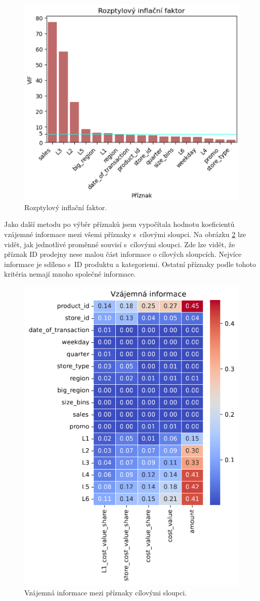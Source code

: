 \begin{figure}[h!]
      \centering
      \includegraphics[width=.6\textwidth]{obrazky/zntb/VIF2.png} %
      \caption{Rozptylový inflační faktor.}
      \label{obr:nb:vif}

    \end{figure}

Jako další metodu po výběr příznaků jsem vypočítala hodnotu koeficientů vzájemné informace mezi všemi příznaky s~cílovými sloupci. Na obrázku \ref*{obr:nb:MI_FS} lze vidět, jak jednotlivé proměnné souvisí s~cílovými sloupci. 
Zde lze vidět, že příznak ID prodejny nese malou část informace o cílových sloupcích. Nejvíce informace je sdíleno s~ID produktu a kategoriemi. Ostatní příznaky podle tohoto kritéria nemají mnoho společné informace.

\begin{figure}[h!]
    \centering
    \includegraphics[width=.5\textwidth]{obrazky/pripravadat/matrix_MI-everything-SFF-stores-002.png}
    \caption{Vzájemná informace mezi příznaky cílovými sloupci.}
    \label{obr:nb:MI_FS}

  \end{figure}

